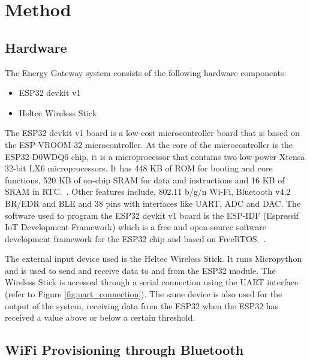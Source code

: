 \section{Method}\label{sec:method}

\subsection{Hardware}

The Energy Gateway system consists of the following hardware components:

\begin{itemize}
  \item ESP32 devkit v1
  \item Heltec Wireless Stick
\end{itemize}

The ESP32 devkit v1 board is a low-cost microcontroller board that is based on the ESP-VROOM-32 microcontroller. At the core of the microcontroller is the ESP32-D0WDQ6 chip, it is a microprocessor that contains two low-power Xtensa 32-bit LX6 microprocessors. It has 448 KB of ROM for booting and core functions, 520 KB of on-chip SRAM for data and instructions and 16 KB of SRAM in RTC.~\cite{espressif:esp32_datasheet}. Other features include, 802.11 b/g/n Wi-Fi, Bluetooth v4.2 BR/EDR and BLE and 38 pins with interfaces like UART, ADC and DAC. The software used to program the ESP32 devkit v1 board is the ESP-IDF (Espressif IoT Development Framework) which is a free and open-source software development framework for the ESP32 chip and based on FreeRTOS.~\cite{espressif:esp-idf-programming-guide}.

The external input device used is the Heltec Wireless Stick. It runs Micropython and is used to send and receive data to and from the ESP32 module. The Wireless Stick is accessed through a serial connection using the UART interface (refer to Figure \ref{fig:uart_connection}). The same device is also used for the output of the system, receiving data from the ESP32 when the ESP32 has received a value above or below a certain threshold.

\subsection{WiFi Provisioning through Bluetooth}

